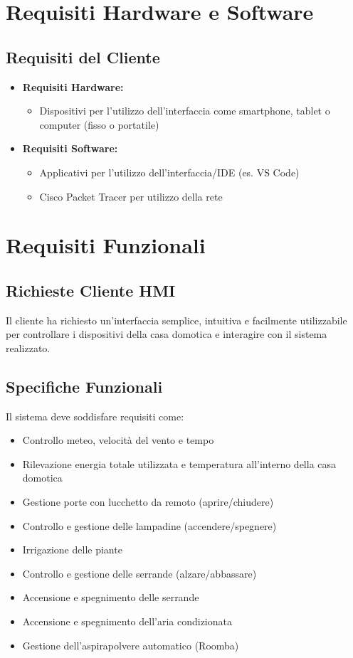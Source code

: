 \documentclass[a4paper,12pt]{article}
\begin{document}
\section{Requisiti Hardware e Software}
\subsection{Requisiti del Cliente}
\begin{itemize}
    \item \textbf{Requisiti Hardware:}
    \begin{itemize}
        \item Dispositivi per l'utilizzo dell'interfaccia come smartphone, tablet o computer (fisso o portatile)
    \end{itemize}
    
    \item \textbf{Requisiti Software:}
    \begin{itemize}
        \item Applicativi per l'utilizzo dell'interfaccia/IDE (es. VS Code)
        \item Cisco Packet Tracer per utilizzo della rete
    \end{itemize}
\end{itemize}

\section{Requisiti Funzionali}
\subsection{Richieste Cliente HMI}
Il cliente ha richiesto un'interfaccia semplice, intuitiva e facilmente utilizzabile per controllare i dispositivi della casa domotica e interagire con il sistema realizzato.

\subsection{Specifiche Funzionali}
Il sistema deve soddisfare requisiti come:\begin{itemize}
    \item Controllo meteo, velocità del vento e tempo
    \item Rilevazione energia totale utilizzata e temperatura all'interno della casa domotica
    \item Gestione porte con lucchetto da remoto (aprire/chiudere)
    \item Controllo e gestione delle lampadine (accendere/spegnere)
    \item Irrigazione delle piante
    \item Controllo e gestione delle serrande (alzare/abbassare)
    \item Accensione e spegnimento delle serrande
    \item Accensione e spegnimento dell'aria condizionata
    \item Gestione dell'aspirapolvere automatico (Roomba)
\end{itemize}
\end{document}
